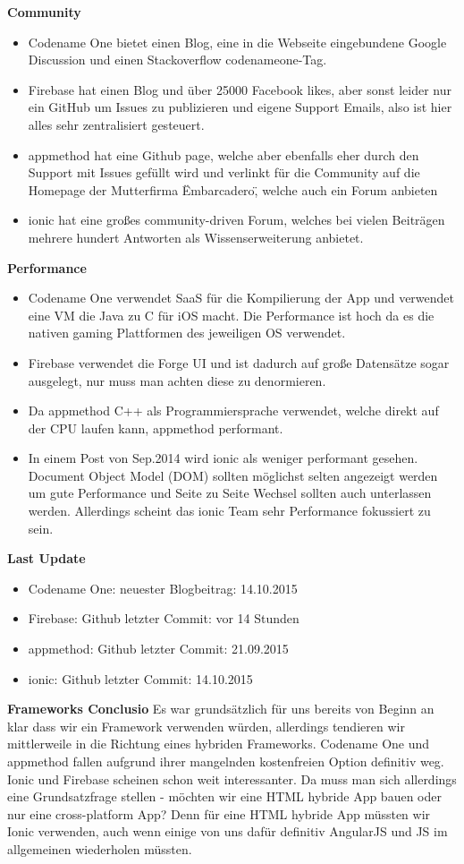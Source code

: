 \textbf{Community}
\begin{itemize}
\item Codename One bietet einen Blog, eine in die Webseite eingebundene Google Discussion und einen Stackoverflow codenameone-Tag.
\item Firebase hat einen Blog und über 25000 Facebook likes, aber sonst leider nur ein GitHub um Issues zu publizieren und eigene Support Emails, also ist hier alles sehr zentralisiert gesteuert. 
\item appmethod hat eine Github page, welche aber ebenfalls eher durch den Support mit Issues gefüllt wird und verlinkt für die Community auf die Homepage der Mutterfirma \"Embarcadero\", welche auch ein Forum anbieten
\item ionic hat eine großes community-driven Forum, welches bei vielen Beiträgen mehrere hundert Antworten als Wissenserweiterung anbietet.
\end{itemize}

\textbf{Performance}
\begin{itemize}
\item Codename One verwendet SaaS für die Kompilierung der App und verwendet eine VM die Java zu C für iOS macht. Die Performance ist hoch da es die nativen gaming Plattformen des jeweiligen OS verwendet. 
\item Firebase verwendet die Forge UI und ist dadurch auf große Datensätze sogar ausgelegt, nur muss man achten diese zu denormieren.
\item Da appmethod C++ als Programmiersprache verwendet, welche direkt auf der CPU laufen kann, appmethod performant.
\item In einem Post von Sep.2014 wird ionic als weniger performant gesehen. Document Object Model (DOM) sollten möglichst selten angezeigt werden um gute Performance und Seite zu Seite Wechsel sollten auch unterlassen werden. Allerdings scheint das ionic Team sehr Performance fokussiert zu sein.
\end{itemize}

\textbf{Last Update}
\begin{itemize}
\item Codename One: neuester Blogbeitrag: 14.10.2015
\item Firebase: Github letzter Commit: vor 14 Stunden
\item appmethod: Github letzter Commit: 21.09.2015
\item ionic: Github letzter Commit: 14.10.2015
\end{itemize}

\textbf{Frameworks Conclusio}
Es war grundsätzlich für uns bereits von Beginn an klar dass wir ein Framework verwenden würden, allerdings tendieren wir mittlerweile in die Richtung eines hybriden Frameworks. Codename One und appmethod fallen aufgrund ihrer mangelnden kostenfreien Option definitiv weg. Ionic und Firebase scheinen schon weit interessanter.
Da muss man sich allerdings eine Grundsatzfrage stellen - möchten wir eine HTML hybride App bauen oder nur eine cross-platform App? Denn für eine HTML hybride App müssten wir Ionic verwenden, auch wenn einige von uns dafür definitiv AngularJS und JS im allgemeinen wiederholen müssten.
\clearpage %